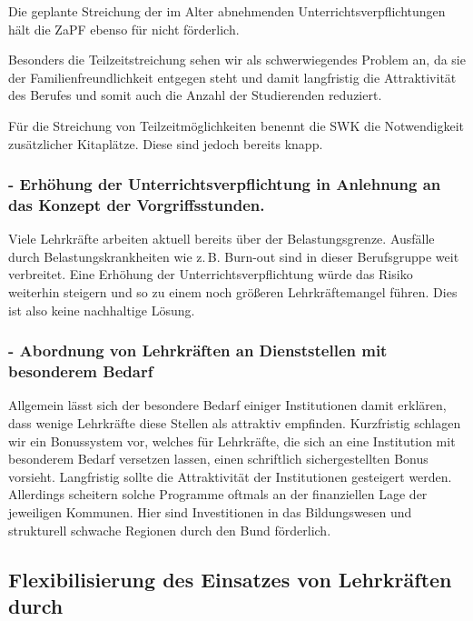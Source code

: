 \documentclass[DIV=calc]{scrartcl}
\begin{document}
Die geplante Streichung der im Alter abnehmenden Unterrichtsverpflichtungen hält die ZaPF ebenso für nicht förderlich.

Besonders die Teilzeitstreichung sehen wir als schwerwiegendes Problem an, da sie der Familienfreundlichkeit entgegen steht und damit langfristig die Attraktivität des Berufes und somit auch die Anzahl der Studierenden reduziert.

Für die Streichung von Teilzeitmöglichkeiten benennt die SWK die Notwendigkeit zusätzlicher Kitaplätze. Diese sind jedoch bereits knapp. 

\subsubsection*{- Erhöhung der Unterrichtsverpflichtung in Anlehnung an das Konzept der Vorgriffsstunden.}
Viele Lehrkräfte arbeiten aktuell bereits über der Belastungsgrenze. Ausfälle durch Belastungskrankheiten wie z.\,B. Burn-out sind in dieser Berufsgruppe weit verbreitet. Eine Erhöhung der Unterrichtsverpflichtung würde das Risiko weiterhin steigern und so zu einem noch größeren Lehrkräftemangel führen. Dies ist also keine nachhaltige Lösung.%

\subsubsection*{- Abordnung von Lehrkräften an Dienststellen mit besonderem Bedarf}

Allgemein lässt sich der besondere Bedarf einiger Institutionen damit erklären, dass wenige Lehrkräfte diese Stellen als attraktiv empfinden.
Kurzfristig schlagen wir ein Bonussystem vor, welches für Lehrkräfte, die sich an eine Institution mit besonderem Bedarf versetzen lassen, einen schriftlich sichergestellten Bonus vorsieht. Langfristig sollte die Attraktivität der Institutionen gesteigert werden.
Allerdings scheitern solche Programme oftmals an der finanziellen Lage der jeweiligen Kommunen. Hier sind Investitionen in das Bildungswesen und strukturell schwache Regionen durch den Bund förderlich. %

\subsection*{Flexibilisierung des Einsatzes von Lehrkräften durch}
\end{document}
